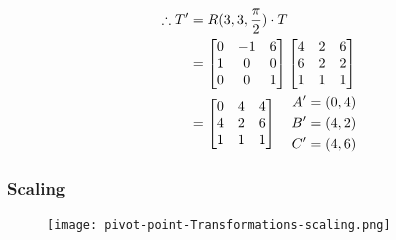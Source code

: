 \begin{framed}
$$\begin{aligned}
  \end{aligned}
  $$
  $$
  \begin{aligned}
    \therefore T^\prime &= R(3, 3, {\pi \over 2}) \cdot T \\
    &=
    \begin{bmatrix}
      0 & -1 & 6 \\
      1 & 0 & 0 \\
      0 & 0 & 1
    \end{bmatrix}
    \begin{bmatrix}
      4 & 2 & 6 \\
      6 & 2 & 2 \\
      1 & 1 & 1
    \end{bmatrix} \\
    &=
    \begin{bmatrix}
      0 & 4 & 4 \\
      4 & 2 & 6 \\
      1 & 1 & 1
    \end{bmatrix}
    \quad
    \begin{aligned}
      A^\prime = (0, 4) \\
      B^\prime = (4, 2) \\
      C^\prime = (4, 6)
    \end{aligned}
  \end{aligned}
  $$
\end{framed}

\subsubsection{Scaling}

\begin{figure}[h]
  \centering
  \texttt{[image: pivot-point-Transformations-scaling.png]}
\end{figure}

